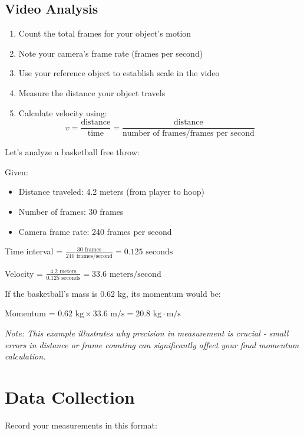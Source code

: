 \documentclass[12pt]{article}
\begin{document}
\subsection*{Video Analysis}
\begin{enumerate}[label=\arabic*.]
\item Count the total frames for your object's motion
\item Note your camera's frame rate (frames per second)
\item Use your reference object to establish scale in the video
\item Measure the distance your object travels
\item Calculate velocity using: $$v = \frac{\text{distance}}{\text{time}} = \frac{\text{distance}}{\text{number of frames}/\text{frames per second}}$$
\end{enumerate}

\begin{tcolorbox}[colback=labblue!5,colframe=labblue,title=\textbf{Sample Calculation}]
Let's analyze a basketball free throw:

Given:
\begin{itemize}
\item Distance traveled: 4.2 meters (from player to hoop)
\item Number of frames: 30 frames
\item Camera frame rate: 240 frames per second
\end{itemize}

Time interval = $\frac{30 \text{ frames}}{240 \text{ frames/second}} = 0.125 \text{ seconds}$

Velocity = $\frac{4.2 \text{ meters}}{0.125 \text{ seconds}} = 33.6 \text{ meters/second}$

If the basketball's mass is 0.62 kg, its momentum would be:

Momentum = $0.62 \text{ kg} \times 33.6 \text{ m/s} = 20.8 \text{ kg}\cdot\text{m/s}$

\textit{Note: This example illustrates why precision in measurement is crucial - small errors in distance or frame counting can significantly affect your final momentum calculation.}
\end{tcolorbox}

\section*{Data Collection}
Record your measurements in this format:
\end{document}
